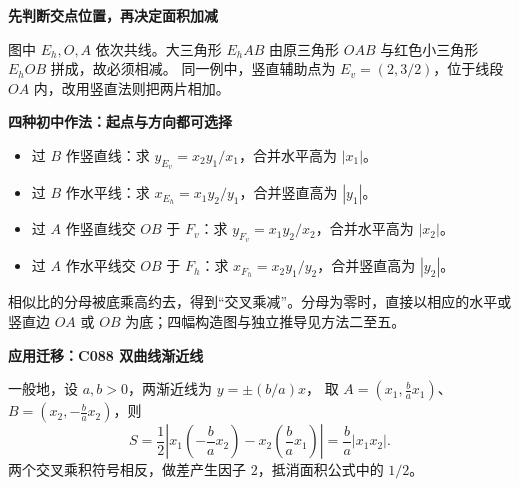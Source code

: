 \begin{explanationbox}
\textbf{\textcolor{CExplanation}{先判断交点位置，再决定面积加减}}

图中 $E_h,O,A$ 依次共线。大三角形 $E_hAB$ 由原三角形 $OAB$ 与红色小三角形 $E_hOB$ 拼成，故必须相减。
同一例中，竖直辅助点为 $E_v=(2,3/2)$，位于线段 $OA$ 内，改用竖直法则把两片相加。
\medskip

\textbf{\textcolor{CExplanation}{四种初中作法：起点与方向都可选择}}
\begin{itemize}[leftmargin=*,itemsep=0.4em]
\item 过 $B$ 作竖直线：求 $y_{E_v}=x_2y_1/x_1$，合并水平高为 $|x_1|$。
\item 过 $B$ 作水平线：求 $x_{E_h}=x_1y_2/y_1$，合并竖直高为 $|y_1|$。
\item 过 $A$ 作竖直线交 $OB$ 于 $F_v$：求 $y_{F_v}=x_1y_2/x_2$，合并水平高为 $|x_2|$。
\item 过 $A$ 作水平线交 $OB$ 于 $F_h$：求 $x_{F_h}=x_2y_1/y_2$，合并竖直高为 $|y_2|$。
\end{itemize}
相似比的分母被底乘高约去，得到“交叉乘减”。分母为零时，直接以相应的水平或竖直边 $OA$ 或 $OB$ 为底；四幅构造图与独立推导见方法二至五。
\end{explanationbox}
\clearpage
\begin{explanationbox}
\textbf{\textcolor{CExplanation}{应用迁移：C088 双曲线渐近线}}

一般地，设 $a,b>0$，两渐近线为 $y=\pm(b/a)x$，
取 $A=(x_1,\frac ba x_1)$、$B=(x_2,-\frac ba x_2)$，则
\[
S=\frac12\left|x_1\left(-\frac ba x_2\right)-x_2\left(\frac ba x_1\right)\right|
=\boxed{\frac ba|x_1x_2|}.
\]
两个交叉乘积符号相反，做差产生因子 $2$，抵消面积公式中的 $1/2$。
\end{explanationbox}
